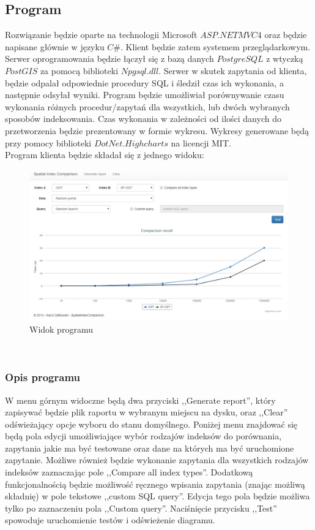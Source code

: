 \documentclass[11pt,a4paper]{article}
\begin{document}
\subsection{Program}
Rozwiązanie będzie oparte na technologii Microsoft $ASP.NET MVC4$ oraz będzie napisane głównie w języku $C\#$. Klient będzie zatem
systemem przeglądarkowym. Serwer oprogramowania będzie łączył się z bazą danych $PostgreSQL$ z wtyczką $PostGIS$ za pomocą biblioteki 
$Npgsql.dll$. Serwer w skutek zapytania od klienta, będzie odpalał odpowiednie procedury SQL i śledził czas ich wykonania, a następnie odsyłał wyniki. 
Program będzie umożliwiał porównywanie czasu wykonania różnych procedur/zapytań dla wszystkich, lub dwóch wybranych sposobów 
indeksowania. Czas wykonania w zależności od ilości danych do przetworzenia będzie prezentowany w formie wykresu. Wykresy 
generowane będą przy pomocy biblioteki $DotNet.Highcharts$ na licencji MIT. \\ 
Program klienta będzie składał się z jednego widoku: \\
\begin{figure}[ht!]
\centering
\includegraphics[width=\textwidth]{Program.jpg}
\caption{Widok programu}
\label{overflow}
\end{figure}
\\
\subsubsection{Opis programu}
W menu górnym widoczne będą dwa przyciski ,,Generate report'', który zapisywać będzie plik raportu w wybranym miejscu na dysku, oraz ,,Clear'' odświeżający opcje wyboru do stanu domyślnego. Poniżej menu znajdować się będą pola edycji umożliwiające wybór rodzajów indeksów do porównania, zapytania jakie ma być testowane oraz dane na których ma być uruchomione zapytanie. Możliwe również będzie wykonanie zapytania dla wszystkich rodzajów indeksów zaznaczając pole
,,Compare all index types''. Dodatkową funkcjonalnością będzie możliwość ręcznego wpisania zapytania (znając możliwą składnię) w pole tekstowe ,,custom SQL query''. Edycja tego pola będzie możliwa tylko po zaznaczeniu pola ,,Custom query''.
Naciśnięcie przycisku ,,Test'' spowoduje uruchomienie testów i odświeżenie diagramu. 
\end{document}
